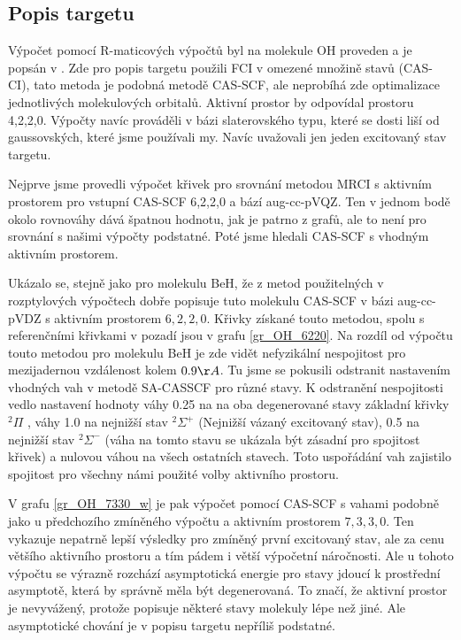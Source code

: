 
\subsection{Popis targetu}
Výpočet pomocí R-maticových výpočtů byl na molekule OH proveden a je popsán v 
\cite{OH_Rmatrix}. Zde pro popis targetu použili FCI v omezené množině stavů (CAS-CI), 
tato metoda je podobná metodě CAS-SCF, ale neprobíhá zde optimalizace jednotlivých 
molekulových orbitalů. Aktivní prostor by odpovídal prostoru 4,2,2,0. Výpočty navíc 
prováděli v bázi slaterovského typu, které se dosti liší od gaussovských, které jsme 
používali my. Navíc uvažovali jen jeden excitovaný stav targetu.

Nejprve jsme provedli výpočet křivek pro srovnání metodou MRCI s 
aktivním prostorem pro vstupní CAS-SCF 6,2,2,0 a bází aug-cc-pVQZ. Ten v jednom bodě 
okolo rovnováhy dává špatnou hodnotu, jak je patrno z grafů, ale to není pro srovnání s 
našimi výpočty podstatné. Poté jsme hledali CAS-SCF s vhodným aktivním prostorem.

Ukázalo se, stejně 
jako pro molekulu BeH, že z metod použitelných v rozptylových výpočtech dobře popisuje 
tuto molekulu CAS-SCF v bázi aug-cc-pVDZ s aktivním prostorem $6,2,2,0$. Křivky  
získané touto metodou, spolu s referenčními křivkami v pozadí jsou v grafu 
\ref{gr_OH_6220}. Na rozdíl od výpočtu touto metodou pro molekulu BeH je zde vidět 
nefyzikální nespojitost pro mezijadernou vzdálenost kolem $0.9\AA$. Tu jsme se 
pokusili odstranit nastavením vhodných vah v metodě SA-CASSCF pro různé stavy. K 
odstranění nespojitosti 
vedlo nastavení hodnoty váhy 0.25 na na oba degenerované 
stavy základní křivky $^2\Pi$ ,
váhy 1.0 na nejnižší stav  $^2\Sigma^+$ (Nejnižší vázaný excitovaný stav), 0.5 na 
nejnižší stav  $^2\Sigma^-$ (váha na tomto stavu se ukázala být zásadní pro 
spojitost křivek) a nulovou váhou na všech ostatních stavech. Toto uspořádání vah 
zajistilo spojitost pro všechny námi použité volby aktivního prostoru.

V grafu \ref{gr_OH_7330_w} je pak výpočet pomocí CAS-SCF s vahami podobně 
jako u předchozího zmíněného výpočtu a aktivním prostorem $7,3,3,0$. Ten vykazuje 
nepatrně lepší výsledky pro zmíněný první excitovaný stav, ale za cenu většího 
aktivního prostoru a tím pádem i větší výpočetní náročnosti. Ale u tohoto výpočtu se 
výrazně rozchází asymptotická energie pro stavy jdoucí k prostřední asymptotě, která 
by správně měla být degenerovaná. To značí, že aktivní prostor je nevyvážený, protože 
popisuje některé stavy molekuly lépe než jiné. Ale asymptotické chování je v popisu targetu nepříliš podstatné.

